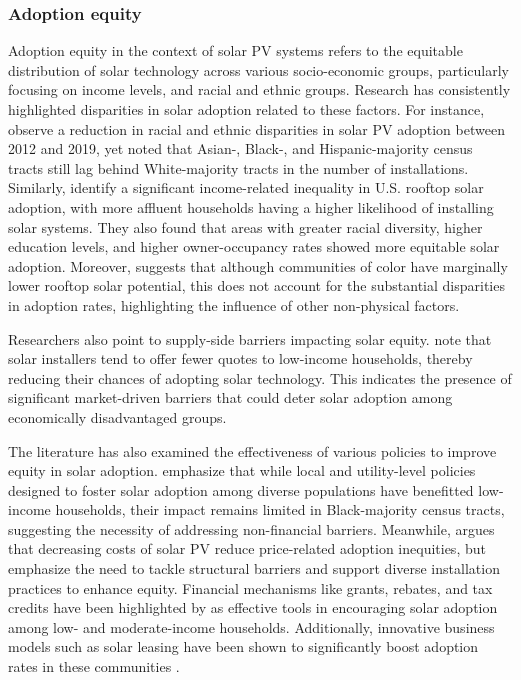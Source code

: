 \documentclass[12pt,twoside,letterpaper]{article}
\begin{document}
 \subsubsection{Adoption equity}

Adoption equity in the context of solar PV systems refers to the equitable distribution of solar technology across various socio-economic groups, particularly focusing on income levels, and racial and ethnic groups. Research has consistently highlighted disparities in solar adoption related to these factors. For instance, \textcite{gao_solar_2022} observe a reduction in racial and ethnic disparities in solar PV adoption between 2012 and 2019, yet noted that Asian-, Black-, and Hispanic-majority census tracts still lag behind White-majority tracts in the number of installations. Similarly, \textcite{darghouth_characterizing_2022} identify a significant income-related inequality in U.S. rooftop solar adoption, with more affluent households having a higher likelihood of installing solar systems. They also found that areas with greater racial diversity, higher education levels, and higher owner-occupancy rates showed more equitable solar adoption. Moreover, \textcite{reames_exploring_2021} suggests that although communities of color have marginally lower rooftop solar potential, this does not account for the substantial disparities in adoption rates, highlighting the influence of other non-physical factors.

Researchers also point to supply-side barriers impacting solar equity. \textcite{oshaughnessy_income-targeted_2021} note that solar installers tend to offer fewer quotes to low-income households, thereby reducing their chances of adopting solar technology. This indicates the presence of significant market-driven barriers that could deter solar adoption among economically disadvantaged groups.

 The literature has also examined the effectiveness of various policies to improve equity in solar adoption. \textcite{gao_solar_2022} emphasize that while local and utility-level policies designed to foster solar adoption among diverse populations have benefitted low-income households, their impact remains limited in Black-majority census tracts, suggesting the necessity of addressing non-financial barriers. Meanwhile, \textcite{darghouth_characterizing_2022} argues that decreasing costs of solar PV reduce price-related adoption inequities, but emphasize the need to tackle structural barriers and support diverse installation practices to enhance equity. Financial mechanisms like grants, rebates, and tax credits have been highlighted by \textcite{oshaughnessy_rooftop_2022} as effective tools in encouraging solar adoption among low- and moderate-income households. Additionally, innovative business models such as solar leasing have been shown to significantly boost adoption rates in these communities \parencite{oshaughnessy_impact_2021}.
\end{document}
